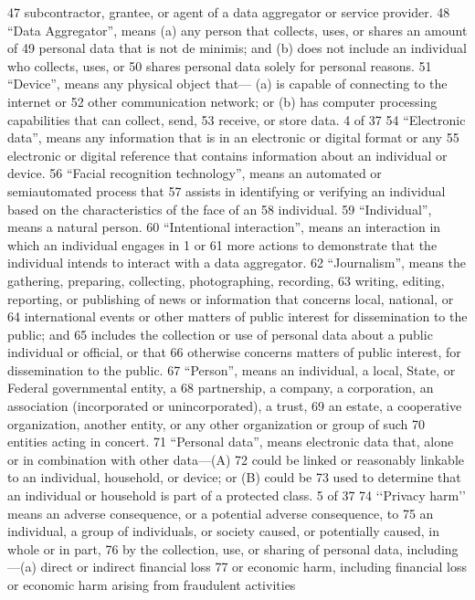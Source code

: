 47 subcontractor, grantee, or agent of a data aggregator or service provider.
48 “Data Aggregator”, means (a) any person that collects, uses, or shares an amount of
49 personal data that is not de minimis; and (b) does not include an individual who collects, uses, or
50 shares personal data solely for personal reasons.
51 “Device”, means any physical object that— (a) is capable of connecting to the internet or
52 other communication network; or (b) has computer processing capabilities that can collect, send,
53 receive, or store data.
4 of 37
54 “Electronic data”, means any information that is in an electronic or digital format or any
55 electronic or digital reference that contains information about an individual or device.
56 “Facial recognition technology”, means an automated or semiautomated process that
57 assists in identifying or verifying an individual based on the characteristics of the face of an
58 individual.
59 “Individual”, means a natural person.
60 “Intentional interaction”, means an interaction in which an individual engages in 1 or
61 more actions to demonstrate that the individual intends to interact with a data aggregator.
62 “Journalism”, means the gathering, preparing, collecting, photographing, recording,
63 writing, editing, reporting, or publishing of news or information that concerns local, national, or
64 international events or other matters of public interest for dissemination to the public; and
65 includes the collection or use of personal data about a public individual or official, or that
66 otherwise concerns matters of public interest, for dissemination to the public.
67 “Person”, means an individual, a local, State, or Federal governmental entity, a
68 partnership, a company, a corporation, an association (incorporated or unincorporated), a trust,
69 an estate, a cooperative organization, another entity, or any other organization or group of such
70 entities acting in concert.
71 “Personal data”, means electronic data that, alone or in combination with other data—(A)
72 could be linked or reasonably linkable to an individual, household, or device; or (B) could be
73 used to determine that an individual or household is part of a protected class.
5 of 37
74 ‘‘Privacy harm’’ means an adverse consequence, or a potential adverse consequence, to
75 an individual, a group of individuals, or society caused, or potentially caused, in whole or in part,
76 by the collection, use, or sharing of personal data, including—(a) direct or indirect financial loss
77 or economic harm, including financial loss or economic harm arising from fraudulent activities
